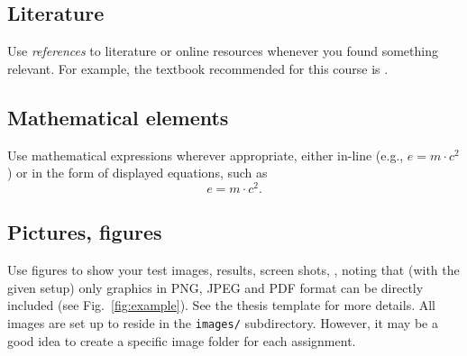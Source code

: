 \documentclass[english,notitlepage,smartquotes]{hgbreport}
\begin{document}
\subsection{Literature}

Use \emph{references} to literature or online resources whenever you found 
something relevant. For example, the textbook recommended for this course is
\cite{Sedgewick2011}.

\subsection{Mathematical elements}

Use mathematical expressions wherever appropriate, either in-line 
(e.g., $e = m \cdot c^2$) or in the form of displayed equations, such as
%
\begin{equation}
	e = m \cdot c^2 .
\end{equation}

\subsection{Pictures, figures}

Use figures to show your test images, results, screen shots, \etc, noting that
(with the given setup) only graphics in PNG, JPEG and PDF format can be directly
included (see Fig.~\ref{fig:example}).
See the thesis template for more details.
All images are set up to reside in the \verb!images/! subdirectory.
However, it may be a good idea to create a specific image folder for each
assignment.
\end{document}
